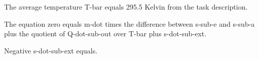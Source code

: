 The average temperature T-bar equals 295.5 Kelvin from the task description.

The equation zero equals m-dot times the difference between s-sub-e and s-sub-a plus the quotient of Q-dot-sub-out over T-bar plus s-dot-sub-ext.

Negative s-dot-sub-ext equals.
